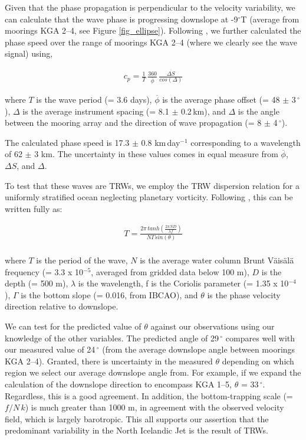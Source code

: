 \documentclass[12pt,titlepage,figuresatend]{article}
\begin{document}
Given that the phase propagation is perpendicular to the velocity variability, we can calculate that the wave phase is progressing downslope at -9$^{\circ}$T (average from moorings KGA 2--4, see Figure \ref{fig_ellipse}). Following \cite{Pickart1990}, we further calculated the phase speed over the range of moorings KGA 2--4 (where we clearly see the wave signal) using,

\begin{eqnarray*}
  c_p = \frac{1}{T}\, \frac{360}{\overline{\phi}}\, \frac{\overline{\Delta S}}{cos(\Delta)}
\end{eqnarray*}

where $T$ is the wave period (= 3.6 days), $\overline{\phi}$ is the average phase offset (= 48 $\pm$ 3$\,^{\circ}$), $\Delta$ is the average instrument spacing (= 8.1 $\pm$ 0.2$\,$km), and $\Delta$ is the angle between the mooring array and the direction of wave propagation (= 8 $\pm$ 4$\,^{\circ}$).

The calculated phase speed is 17.3 $\pm$ 0.8 km$\,$day$^{-1}$ corresponding to a wavelength of 62 $\pm$ 3 km. The uncertainty in these values comes in equal measure from $\overline{\phi}$, $\Delta S$, and $\Delta$.

To test that these waves are TRWs, we employ the TRW dispersion relation for a uniformly stratified ocean neglecting planetary vorticity. Following \cite{Pedlosky1979}, this can be written fully as:

\begin{eqnarray*}
  T = \frac{2\pi \,tanh(\frac{2\pi ND}{\lambda f})}{N\Gamma sin(\theta)}\\
\end{eqnarray*}

where $T$ is the period of the wave, $N$ is the average water column Brunt V{\"a}is{\"a}l{\"a} frequency (= 3.3 x 10$^{-5}$, averaged from gridded data below 100 m), $D$ is the depth (= 500 m), $\lambda$ is the wavelength, f is the Coriolis parameter (= 1.35 x 10$^{-4}$), $\Gamma$ is the bottom slope (= 0.016, from IBCAO), and $\theta$ is the phase velocity direction relative to downslope. 

We can test for the predicted value of $\theta$ against our observations using our knowledge of the other variables. The predicted angle of 29$\,^{\circ}$ compares well with our measured value of 24$\,^{\circ}$ (from the average downslope angle between moorings KGA 2--4). Granted, there is uncertainty in the measured $\theta$ depending on which region we select our average downslope angle from. For example, if we expand the calculation of the downslope direction to encompass KGA 1--5, $\theta$ = 33$\,^{\circ}$. Regardless, this is a good agreement. In addition, the bottom-trapping scale (=$f/N\,k$) is much greater than 1000 m, in agreement with the observed velocity field, which is largely barotropic. This all supports our assertion that the predominant variability in the North Icelandic Jet is the result of TRWs.
\end{document}
